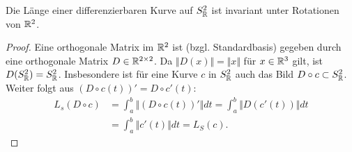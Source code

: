 \begin{lemma}
  \label{lemma:kurvenlaengen}
  Die Länge einer differenzierbaren Kurve auf $ S^2_{\mathbb{R}} $ ist invariant unter Rotationen von $ \mathbb{R}^2 $.
  \begin{proof}
    Eine orthogonale Matrix im $ \mathbb{R}^2 $ ist (bzgl. Standardbasis) gegeben durch eine orthogonale Matrix $ D \in \mathbb{R}^{2 \times 2} $. Da $ \Vert D(x) \Vert = \Vert x \Vert $ für $ x \in \mathbb{R}^3 $ gilt, ist $ D(S^2_{\mathbb{R}}) = S^2_{\mathbb{R}} $. Insbesondere ist für eine Kurve $ c $ in $ S^2_{\mathbb{R}} $ auch das Bild $ D \circ c \subset S^2_{\mathbb{R}} $. \\
    Weiter folgt aus $ (D \circ c(t))' = D \circ c'(t) $:
    \begin{align*}
      L_s(D \circ c) &= \int_a^b \Vert (D \circ c(t))' \Vert dt = \int_a^b \Vert D(c'(t)) \Vert dt \\
        &= \int_a^b \Vert c'(t) \Vert dt = L_S(c)\text{.}
    \end{align*}
  \end{proof}
\end{lemma}

